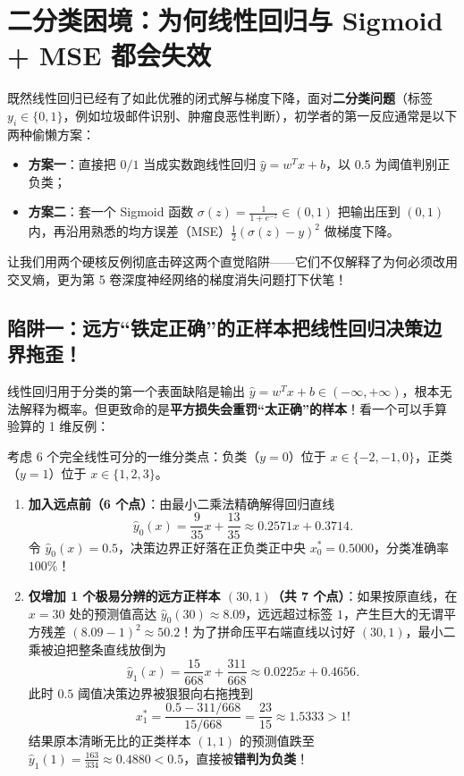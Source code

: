 \section{二分类困境：为何线性回归与 Sigmoid + MSE 都会失效}
\label{sec:ch6-binary-traps}

既然线性回归已经有了如此优雅的闭式解与梯度下降，面对\textbf{二分类问题}（标签 $y_i \in \{0, 1\}$，例如垃圾邮件识别、肿瘤良恶性判断），初学者的第一反应通常是以下两种偷懒方案：
\begin{itemize}
  \item \textbf{方案一}：直接把 $0/1$ 当成实数跑线性回归 $\hat{y} = w^T x + b$，以 $0.5$ 为阈值判别正负类；
  \item \textbf{方案二}：套一个 Sigmoid 函数 $\sigma(z) = \frac{1}{1+e^{-z}} \in (0, 1)$ 把输出压到 $(0,1)$ 内，再沿用熟悉的均方误差（MSE）$\frac{1}{2}(\sigma(z) - y)^2$ 做梯度下降。
\end{itemize}
让我们用两个硬核反例彻底击碎这两个直觉陷阱——它们不仅解释了为何必须改用交叉熵，更为第 5 卷深度神经网络的梯度消失问题打下伏笔！

\subsection{陷阱一：远方“铁定正确”的正样本把线性回归决策边界拖歪！}
\label{subsec:ch6-linreg-fail}

线性回归用于分类的第一个表面缺陷是输出 $\hat{y} = w^T x + b \in (-\infty, +\infty)$，根本无法解释为概率。但更致命的是\textbf{平方损失会重罚“太正确”的样本}！看一个可以手算验算的 1 维反例：

\begin{example}
\label{ex:ch6-ols-drag}
考虑 6 个完全线性可分的一维分类点：负类（$y=0$）位于 $x \in \{-2, -1, 0\}$，正类（$y=1$）位于 $x \in \{1, 2, 3\}$。
\begin{enumerate}
  \item \textbf{加入远点前（6 个点）}：由最小二乘法精确解得回归直线
  \[
    \hat{y}_0(x) = \frac{9}{35}x + \frac{13}{35} \approx 0.2571x + 0.3714.
  \]
  令 $\hat{y}_0(x) = 0.5$，决策边界正好落在正负类正中央 $x_0^* = \mathbf{0.5000}$，分类准确率 $100\%$！
  \item \textbf{仅增加 1 个极易分辨的远方正样本 $(30, 1)$（共 7 个点）}：如果按原直线，在 $x=30$ 处的预测值高达 $\hat{y}_0(30) \approx 8.09$，远远超过标签 $1$，产生巨大的无谓平方残差 $(8.09 - 1)^2 \approx 50.2$！为了拼命压平右端直线以讨好 $(30, 1)$，最小二乘被迫把整条直线放倒为
  \[
    \hat{y}_1(x) = \frac{15}{668}x + \frac{311}{668} \approx 0.0225x + 0.4656.
  \]
  此时 $0.5$ 阈值决策边界被狠狠向右拖拽到
  \[
    x_1^* = \frac{0.5 - 311/668}{15/668} = \frac{23}{15} \approx \mathbf{1.5333} > 1!
  \]
  结果原本清晰无比的正类样本 $(1, 1)$ 的预测值跌至 $\hat{y}_1(1) = \frac{163}{334} \approx 0.4880 < 0.5$，直接被\textbf{错判为负类}！
\end{enumerate}
\end{example}

